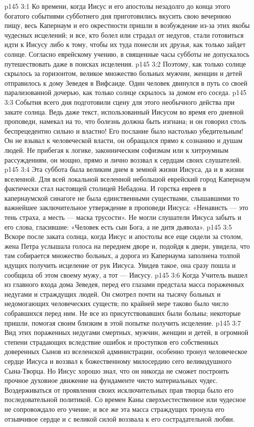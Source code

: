 \vs p145 3:1 Ко времени, когда Иисус и его апостолы незадолго до конца этого богатого событиями субботнего дня приготовились вкусить свою вечернюю пищу, весь Капернаум и его окрестности пришли в возбуждение из\hyp{}за этих якобы чудесных исцелений; и все, кто болел или страдал от недугов, стали готовиться идти к Иисусу либо к тому, чтобы их туда понесли их друзья, как только зайдет солнце. Согласно еврейскому учению, в священные часы субботы не допускалось путешествовать даже в поисках исцеления.
\vs p145 3:2 Поэтому, как только солнце скрылось за горизонтом, великое множество больных мужчин, женщин и детей отправилось к дому Зеведея в Вифсаиде. Один человек двинулся в путь со своей парализованной дочерью, как только солнце скрылось за домом его соседа.
\vs p145 3:3 События всего дня подготовили сцену для этого необычного действа при закате солнца. Ведь даже текст, использованный Иисусом во время его дневной проповеди, намекал на то, что болезнь должна быть изгнана; и он говорил столь беспрецедентно сильно и властно! Его послание было настолько убедительным! Он не взывал к человеческой власти, он обращался прямо к сознанию и душам людей. Не прибегая к логике, законническим софизмам или к хитроумным рассуждениям, он мощно, прямо и лично воззвал к сердцам своих слушателей.
\vs p145 3:4 \pc Эта суббота была великим днем в земной жизни Иисуса, да и в жизни вселенной. Для всей локальной вселенной небольшой еврейский город Капернаум фактически стал настоящей столицей Небадона. И горстка евреев в капернаумской синагоге не была единственными существами, слышавшими то важнейшее заключительное утверждение в проповеди Иисуса: «Ненависть --- это тень страха, а месть --- маска трусости». Не могли слушатели Иисуса забыть и его слова, гласившие: «Человек есть сын Бога, а не дитя дьявола».
\vs p145 3:5 \pc Вскоре после заката солнца, когда Иисус и апостолы все еще сидели за столом, жена Петра услышала голоса на переднем дворе и, подойдя к двери, увидела, что там собирается множество больных, а дорога из Капернаума заполнена толпой идущих получить исцеление от рук Иисуса. Увидев такое, она сразу пошла и сообщила об этом своему мужу, а тот --- Иисусу.
\vs p145 3:6 Когда Учитель вышел из главного входа дома Зеведея, перед его глазами предстала масса пораженных недугами и страждущих людей. Он смотрел почти на тысячу больных и недомогающих человеческих существ; по крайней мере таково было число собравшихся перед ним. Не все из присутствовавших были больны; некоторые пришли, помогая своим близким в этой попытке получить исцеление.
\vs p145 3:7 Вид этих пораженных недугами смертных, мужчин, женщин и детей, в огромной степени страдающих вследствие ошибок и проступков его собственных доверенных Сынов из вселенской администрации, особенно тронул человеческое сердце Иисуса и воззвал к божественному милосердию сего великодушного Сына\hyp{}Творца. Но Иисус хорошо знал, что он никогда не сможет построить прочное духовное движение на фундаменте чисто материальных чудес. Воздерживаться от проявления своих исключительных прав творца было его последовательной политикой. Со времен Каны сверхъестественное или чудесное не сопровождало его учение; и все же эта масса страждущих тронула его отзывчивое сердце и с великой силой воззвала к его сострадательной любви.
